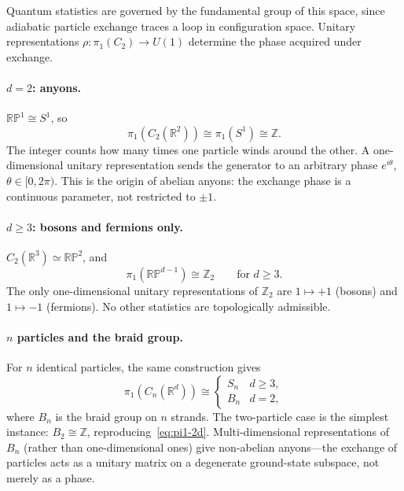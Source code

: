 Quantum statistics are governed by the fundamental group of this space, since adiabatic particle exchange traces a loop in configuration space.  Unitary representations $\rho : \pi_1(C_2) \to U(1)$ determine the phase acquired under exchange.

\paragraph{$d = 2$: anyons.}
$\mathbb{RP}^1 \cong S^1$, so
\begin{equation}
  \pi_1(C_2(\mathbb{R}^2)) \cong \pi_1(S^1) \cong \mathbb{Z}.
  \label{eq:pi1-2d}
\end{equation}
The integer counts how many times one particle winds around the other.  A one-dimensional unitary representation sends the generator to an arbitrary phase $e^{i\theta}$, $\theta \in [0, 2\pi)$.  This is the origin of abelian anyons: the exchange phase is a continuous parameter, not restricted to $\pm 1$.

\paragraph{$d \geq 3$: bosons and fermions only.}
$C_2(\mathbb{R}^3) \simeq \mathbb{RP}^2$, and
\begin{equation}
  \pi_1(\mathbb{RP}^{d-1}) \cong \mathbb{Z}_2 \qquad \text{for } d \geq 3.
  \label{eq:pi1-3d}
\end{equation}
The only one-dimensional unitary representations of $\mathbb{Z}_2$ are $1 \mapsto +1$ (bosons) and $1 \mapsto -1$ (fermions).  No other statistics are topologically admissible.

\paragraph{$n$ particles and the braid group.}
For $n$ identical particles, the same construction gives
\begin{equation}
  \pi_1(C_n(\mathbb{R}^d)) \cong
  \begin{cases}
    S_n & d \geq 3, \\
    B_n & d = 2,
  \end{cases}
  \label{eq:pi1-n-particles}
\end{equation}
where $B_n$ is the braid group on $n$ strands.  The two-particle case is the simplest instance: $B_2 \cong \mathbb{Z}$, reproducing~\eqref{eq:pi1-2d}.  Multi-dimensional representations of $B_n$ (rather than one-dimensional ones) give non-abelian anyons---the exchange of particles acts as a unitary matrix on a degenerate ground-state subspace, not merely as a phase.

